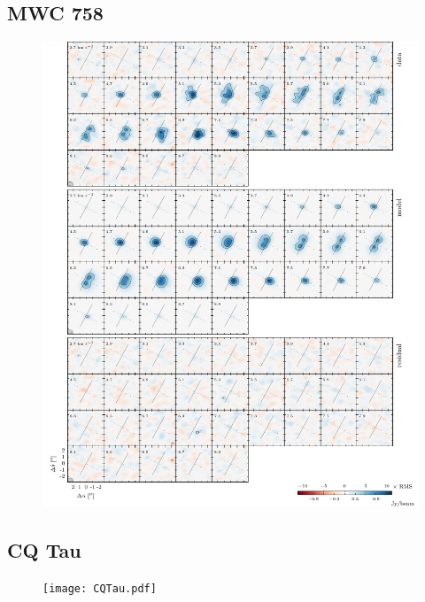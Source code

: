 \documentclass[twocolumn]{aastex6}
\begin{document}
\subsection{MWC 758}

\begin{figure}[htb]
\begin{center}
  \includegraphics{MWC758.pdf}
  \end{center}
\end{figure}

\subsection{CQ Tau}

\begin{figure}[htb]
\begin{center}
  \texttt{[image: CQTau.pdf]}
  \end{center}
\end{figure}
\end{document}
